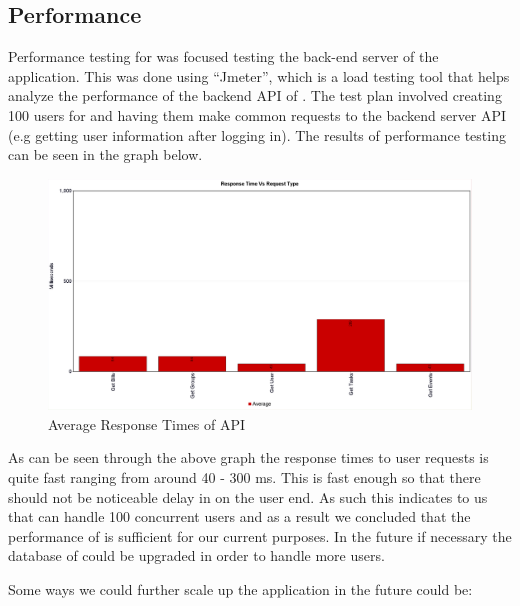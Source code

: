 \documentclass[12pt, titlepage]{article}
\begin{document}
		
\subsection{Performance}

Performance testing for \progname{} was focused testing the back-end server of the application. This was done using ``Jmeter'', which is a load testing tool that helps analyze the performance of the backend API of \progname{}. The test plan involved creating 100 users for \progname{} and having them make common requests to the backend server API (e.g getting user information after logging in). The results of performance testing can be seen in the graph below.


\begin{figure}[H]
    \centering
    \hspace*{-1cm}
    \includegraphics[width=1.25\linewidth]{Response_Time.png}
    \caption{Average Response Times of \progname{} API}
    \label{fig:responsetimegraph}
\end{figure}

As can be seen through the above graph the response times to user requests is quite fast ranging from around  40 - 300 ms. This is fast enough so that there should not be noticeable delay in \progname{} on the user end. As such this indicates to us that \progname{} can handle 100 concurrent users and as a result we concluded that the performance of \progname{} is sufficient for our current purposes. In the future if necessary the database of \progname{} could be upgraded in order to handle more users.

Some ways we could further scale up the application in the future could be:
\end{document}

